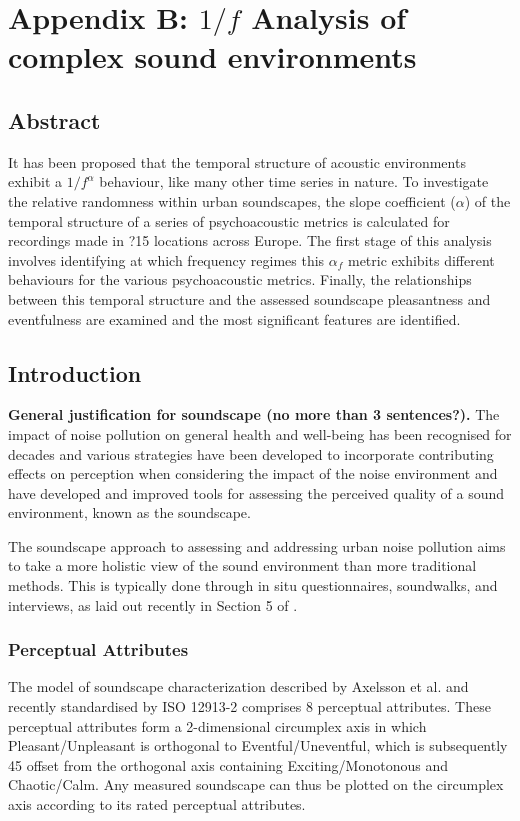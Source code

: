 \chapter{Appendix B: $1/f$ Analysis of complex sound environments}
\label{app:overf}


\section{Abstract}

It has been proposed that the temporal structure of acoustic environments exhibit a $1/f^\alpha$ behaviour, like many other time series in nature. To investigate the relative randomness within urban soundscapes, the slope coefficient ($\alpha$) of the temporal structure of a series of psychoacoustic metrics is calculated for recordings made in ?15 locations across Europe. The first stage of this analysis involves identifying at which frequency regimes this $\alpha_{f}$ metric exhibits different behaviours for the various psychoacoustic metrics. Finally, the relationships between this temporal structure and the assessed soundscape pleasantness and eventfulness are examined and the most significant features are identified.

\section{Introduction}

\textbf{General justification for soundscape (no more than 3 sentences?).}
The impact of noise pollution on general health and well-being has been recognised for decades and various strategies have been developed to incorporate contributing effects on perception when considering the impact of the noise environment and have developed and improved tools for assessing the perceived quality of a sound environment, known as the soundscape.

The soundscape approach to assessing and addressing urban noise pollution aims to take a more holistic view of the sound environment than more traditional methods. This is typically done through in situ questionnaires, soundwalks, and interviews, as laid out recently in Section 5 of \citet{ISO12913Part2}.

\subsection{Perceptual Attributes}
The model of soundscape characterization described by Axelsson et al. \cite{Axelsson2010principal} and recently standardised by ISO 12913-2 \citep{ISO12913Part2} comprises 8 perceptual attributes. These perceptual attributes form a 2-dimensional circumplex axis in which Pleasant/Unpleasant is orthogonal to Eventful/Uneventful, which is subsequently 45\degree{} offset from the orthogonal axis containing Exciting/Monotonous
and Chaotic/Calm. Any measured soundscape can thus be plotted on the circumplex axis according to its rated perceptual attributes.

